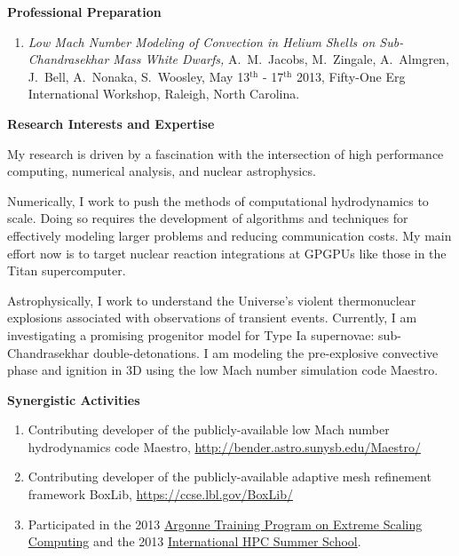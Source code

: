 \documentclass[11pt,letterpaper,english]{article}
\begin{document}
\begin{flushleft} {\bf Professional Preparation}
\begin{enumerate}
\item {\it Low Mach Number Modeling of Convection in Helium Shells on 
      Sub-Chandrasekhar Mass White Dwarfs,} A.~M.~Jacobs, M.~Zingale, A.~Almgren, J.~Bell, A.~Nonaka,
      S.~Woosley, May 13$^{\mathrm{th}}$ - 17$^{\mathrm{th}}$ 2013, Fifty-One Erg International 
      Workshop, Raleigh, North Carolina.

\end{enumerate} 

\vspace{-6pt}
{\bf Research Interests and Expertise}
{\parindent 16pt

  My research is driven by a fascination with the intersection of
  high performance computing, numerical analysis, and nuclear astrophysics.  
  
  Numerically, I work to push the methods of computational hydrodynamics
  to scale.  Doing so requires the development of algorithms and techniques
  for effectively modeling larger problems and reducing communication costs.
  My main effort now is to target nuclear reaction integrations at GPGPUs
  like those in the Titan supercomputer.
  
  Astrophysically, I work to understand the Universe's violent thermonuclear
  explosions associated with observations of transient events.  Currently,
  I am investigating a promising progenitor model for Type Ia supernovae:
  sub-Chandrasekhar double-detonations.  I am modeling the pre-explosive
  convective phase and ignition in 3D using the low Mach number simulation
  code Maestro.

}

\vspace{.04in}
{\bf Synergistic Activities}
\vspace{-6pt}
\begin{enumerate} \itemsep1pt \parskip0pt 
\item Contributing developer of the publicly-available low Mach number
  hydrodynamics code Maestro,
  \url{http://bender.astro.sunysb.edu/Maestro/} \\

\item Contributing developer of the publicly-available adaptive mesh
  refinement framework BoxLib,
  \url{https://ccse.lbl.gov/BoxLib/} \\


\item Participated in the 2013 
  \href{http://extremecomputingtraining.anl.gov/}{Argonne Training Program on Extreme Scaling Computing} and the 
  2013 \href{https://www.xsede.org/web/summerschool13/home}{International HPC Summer School}. \\


\end{enumerate}
\end{flushleft}
\end{document}
